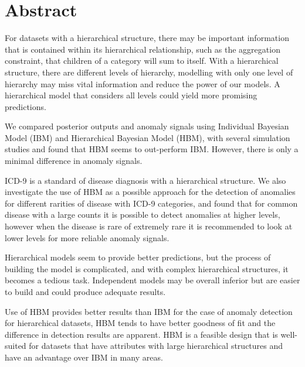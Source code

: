 \chapter*{Abstract}

For datasets with a hierarchical structure, there may be important information that is contained within its hierarchical relationship, such as the aggregation constraint, that children of a category will sum to itself. With a hierarchical structure, there are different levels of hierarchy, modelling with only one level of hierarchy may miss vital information and reduce the power of our models. A hierarchical model that considers all levels could yield more promising predictions.

\newpara

We compared posterior outputs and anomaly signals using Individual Bayesian Model (IBM) and Hierarchical Bayesian Model (HBM), with several simulation studies and found that HBM seems to out-perform IBM. However, there is only a minimal difference in anomaly signals.

\newpara

ICD-9 is a standard of disease diagnosis with a hierarchical structure. We also investigate the use of HBM as a possible approach for the detection of anomalies for different rarities of disease with ICD-9 categories, and found that for common disease with a large counts it is possible to detect anomalies at higher levels, however when the disease is rare of extremely rare it is recommended to look at lower levels for more reliable anomaly signals. 

\newpara 

Hierarchical models seem to provide better predictions, but the process of building the model is complicated, and with complex hierarchical structures, it becomes a tedious task. Independent models may be overall inferior but are easier to build and could produce adequate results. 

\newpara

Use of HBM provides better results than IBM for the case of anomaly detection for hierarchical datasets, HBM tends to have better goodness of fit and the difference in detection results are apparent. HBM is a feasible design that is well-suited for datasets that have attributes with large hierarchical structures and have an advantage over IBM in many areas. 
		
		